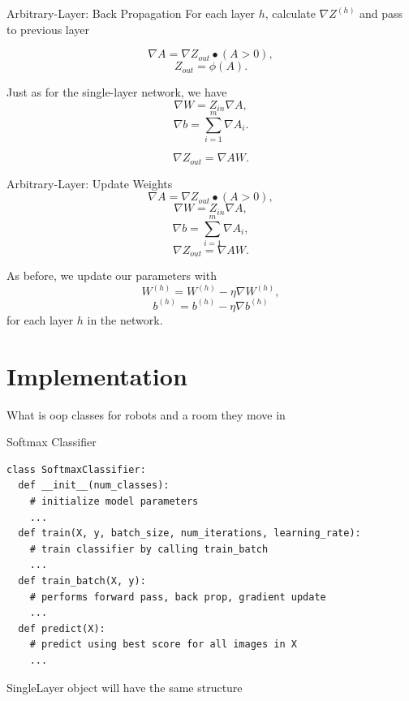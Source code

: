 \documentclass{beamer}
\begin{document}
  \begin{frame}{Arbitrary-Layer: Back Propagation}
    For each layer $h$, calculate $\nabla Z^{(h)}$ and pass to previous layer

    $$ \nabla A = \nabla Z_{out} \bullet \left( A > 0 \right), $$
    $$ Z_{out}  = \phi\left( A \right). $$

    Just as for the single-layer network, we have
    $$ \nabla W = Z_{in} \nabla A, $$
    $$ \nabla b = \sum_{i=1}^m \nabla A_i. $$

    $$ \nabla Z_{out} = \nabla AW. $$

  \end{frame}

  \begin{frame}{Arbitrary-Layer: Update Weights}
    $$ \nabla A = \nabla Z_{out} \bullet \left( A > 0 \right), $$
    $$ \nabla W = Z_{in} \nabla A, $$
    $$ \nabla b = \sum_{i=1}^m \nabla A_i, $$
    $$ \nabla Z_{out} = \nabla AW. $$

    As before, we update our parameters with
      $$ W^{(h)} = W^{(h)} - \eta \nabla W^{(h)}, $$
      $$ b^{(h)} = b^{(h)} - \eta \nabla b^{(h)} $$
    for each layer $h$ in the network.
  \end{frame}

  \section{Implementation}

  \begin{frame}{What is oop}
    classes for robots and a room they move in
  \end{frame}

  \begin{frame}[fragile]{Softmax Classifier}

\begin{verbatim}
class SoftmaxClassifier:
  def __init__(num_classes):
    # initialize model parameters
    ...
  def train(X, y, batch_size, num_iterations, learning_rate):
    # train classifier by calling train_batch
    ...
  def train_batch(X, y):
    # performs forward pass, back prop, gradient update
    ...
  def predict(X):
    # predict using best score for all images in X
    ...
\end{verbatim}

{\ttfamily SingleLayer} object will have the same structure

  \end{frame}
\end{document}
